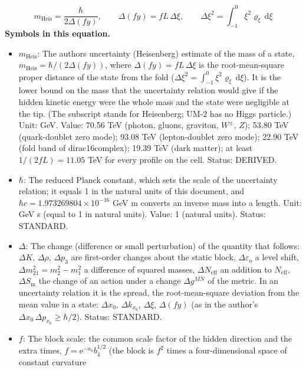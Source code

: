 \documentclass[
  10pt,
]{article}
\providecommand{\tightlist}{%
  \setlength{\itemsep}{0pt}\setlength{\parskip}{0pt}}
\begin{document}
\[ m_{\mathrm{Heis}} = \frac{\hbar}{2\Delta(fy)},\qquad \Delta(fy) = fL\,\Delta\xi,\qquad \Delta\xi^2 = \int_{-1}^{0}\xi^2\varrho_\xi\,\mathrm{d}\xi \]
\textbf{Symbols in this equation.}

\begin{itemize}
\tightlist
\item
  \(m_{\mathrm{Heis}}\): The author\textquotesingle s uncertainty
  (Heisenberg) estimate of the mass of a state,
  \(m_{\mathrm{Heis}} = \hbar/(2\Delta(fy))\), where
  \(\Delta(fy) = fL\,\Delta\xi\) is the root-mean-square proper distance
  of the state from the fold
  (\(\Delta\xi^2 = \int_{-1}^{0}\xi^2\varrho_\xi\,\mathrm{d}\xi\)). It
  is the lower bound on the mass that the uncertainty relation would
  give if the hidden kinetic energy were the whole mass and the state
  were negligible at the tip. (The subscript stands for Heisenberg; UM-2
  has no Higgs particle.) Unit: GeV. Value: 70.56 TeV (photon, gluons,
  graviton, \(W^\pm\), \(Z\)); 53.80 TeV (quark-doublet zero mode);
  93.08 TeV (lepton-doublet zero mode); 22.90 TeV (fold band of
  dirac16complex); 19.39 TeV (dark matter); at least \(1/(2fL) = 11.05\)
  TeV for every profile on the cell. Status: DERIVED.
\item
  \(\hbar\): The reduced Planck constant, which sets the scale of the
  uncertainty relation; it equals 1 in the natural units of this
  document, and \(\hbar c = 1.973269804\times10^{-16}\) GeV m converts
  an inverse mass into a length. Unit: GeV s (equal to 1 in natural
  units). Value: 1 (natural units). Status: STANDARD.
\item
  \(\Delta\): The change (difference or small perturbation) of the
  quantity that follows: \(\Delta K\), \(\Delta\rho\), \(\Delta p_3\)
  are first-order changes about the static block,
  \(\Delta\varepsilon_o\) a level shift,
  \(\Delta m^2_{21} = m_2^2 - m_1^2\) a difference of squared masses,
  \(\Delta N_{\mathrm{eff}}\) an addition to \(N_{\mathrm{eff}}\),
  \(\Delta S_{\mathrm{m}}\) the change of an action under a change
  \(\Delta g^{MN}\) of the metric. In an uncertainty relation it is the
  spread, the root-mean-square deviation from the mean value in a state:
  \(\Delta x_0\), \(\Delta k_{x_0}\), \(\Delta\xi\), \(\Delta(fy)\) (as
  in the author's \(\Delta x_0\,\Delta p_{x_0} \ge \hbar/2\)). Status:
  STANDARD.
\item
  \(f\): The block scale: the common scale factor of the hidden
  direction and the extra times, \(f = \mathrm{e}^{-a_4}b_4^{1/2}\) (the
  block is \(f^2\) times a four-dimensional space of constant curvature

\end{itemize}
\end{document}
